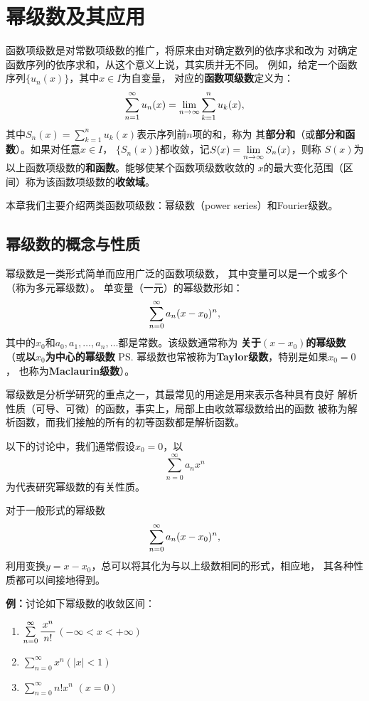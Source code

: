 \newpage

\section{幂级数及其应用}

函数项级数是对常数项级数的推广，将原来由对确定数列的依序求和改为
对确定函数序列的依序求和，从这个意义上说，其实质并无不同。
例如，给定一个函数序列$\{u_n(x)\}$，其中$x\in I$为自变量，
对应的{\bf 函数项级数}定义为：
$$\sumn u_n(x)=\limn\sum\limits_{k=1}^nu_k(x),$$
其中$S_n(x)=\sum\limits_{k=1}^nu_k(x)$表示序列前$n$项的和，称为
其{\bf 部分和}（或{\bf 部分和函数}）。如果对任意$x\in I$，
$\{S_n(x)\}$都收敛，记$S(x)=\limn S_n(x)$，则称
$S(x)$为以上函数项级数的{\bf 和函数}。能够使某个函数项级数收敛的
$x$的最大变化范围（区间）称为该函数项级数的{\bf 收敛域}。

本章我们主要介绍两类函数项级数：幂级数（power series）和Fourier级数。

\subsection{幂级数的概念与性质}

幂级数是一类形式简单而应用广泛的函数项级数，
其中变量可以是一个或多个（称为{\kaishu 多元幂级数}）。
单变量（一元）的幂级数形如：
$$\sumn[0]a_n(x-x_0)^n,$$
其中的$x_0$和$a_0,a_1,\ldots,a_n,\ldots$都是常数。该级数通常称为
{\bf 关于$(x-x_0)$的幂级数}（或{\bf 以$x_0$为中心的幂级数}
\ps{幂级数也常被称为{\bf Taylor级数}，特别是如果$x_0=0$，
也称为{\bf Maclaurin级数}}）。

幂级数是分析学研究的重点之一，其最常见的用途是用来表示各种具有良好
解析性质（可导、可微）的函数，事实上，局部上由收敛幂级数给出的函数
被称为{\kaishu 解析函数}，而我们接触的所有的初等函数都是解析函数。

以下的讨论中，我们通常假设$x_0=0$，以
$${\sum\limits_{n=0}^{\infty}a_nx^n}$$
为代表研究幂级数的有关性质。

对于一般形式的幂级数
$$\sumn[0]a_n(x-x_0)^n,$$
利用变换$y=x-x_0$，总可以将其化为与以上级数相同的形式，相应地，
其各种性质都可以间接地得到。

{\bf 例：}讨论如下幂级数的{\kaishu 收敛区间}：
\begin{enumerate}[(1)]
  \setlength{\itemindent}{1cm}
  \item $\sum\limits_{n=0}^{\infty}\df{x^n}{n!}$\hfill $(-\infty<x<+\infty)$
  \item $\sum\limits_{n=0}^{\infty}x^n$\hfill $(|x|<1)$
  \item $\sum\limits_{n=0}^{\infty}n!x^n$ \hfill $(x=0)$
\end{enumerate}

